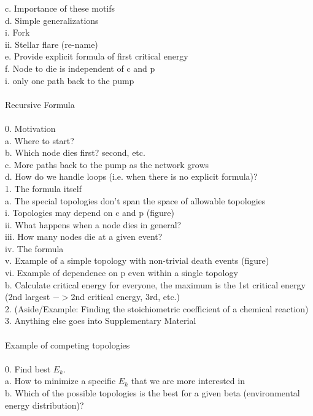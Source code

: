 \documentclass{amsart}
\theoremstyle{plain}
\numberwithin{equation}{section}
\begin{document}
 c. Importance of these motifs\\
 d. Simple generalizations\\
  i. Fork\\
	ii. Stellar flare (re-name)\\
 e. Provide explicit formula of first critical energy\\
 f. Node to die is independent of c and p\\
  i. only one path back to the pump\\
\\
Recursive Formula \\
\\
0. Motivation\\
 a. Where to start?\\
 b. Which node dies first? second, etc.\\
 c. More paths back to the pump as the network grows\\
 d. How do we handle loops (i.e. when there is no explicit formula)?\\
1. The formula itself\\
 a. The special topologies don't span the space of allowable topologies\\
  i. Topologies may depend on c and p (figure)\\
	ii. What happens when a node dies in general?\\
	iii. How many nodes die at a given event?\\
	iv. The formula\\
	v. Example of a simple topology with non-trivial death events (figure)\\
	vi. Example of dependence on p even within a single topology\\
 b. Calculate critical energy for everyone, the maximum is the 1st critical energy (2nd largest $->$2nd critical energy, 3rd, etc.)\\
2. (Aside/Example: Finding the stoichiometric coefficient of a chemical reaction)\\
3. Anything else goes into Supplementary Material\\
\\
Example of competing topologies\\
\\
0. Find best $E_k$. \\
 a. How to minimize a specific $E_k$ that we are more interested in\\
 b. Which of the possible topologies is the best for a given beta (environmental energy distribution)?\\
\end{document}
